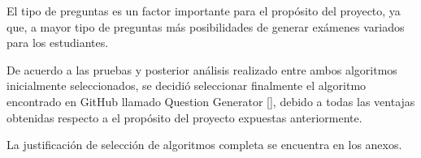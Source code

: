 \documentclass[../Main.tex]{subfiles}
\begin{document}
\begin{justify}
\begin{itemize}
    El tipo de preguntas es un factor importante para el propósito del proyecto, ya que, a mayor tipo de preguntas más posibilidades de generar exámenes variados para los estudiantes.
    
    De acuerdo a las pruebas y posterior análisis realizado entre ambos algoritmos inicialmente seleccionados, se decidió seleccionar finalmente el algoritmo encontrado en GitHub llamado Question Generator [], debido a todas las ventajas obtenidas respecto a el propósito del proyecto expuestas anteriormente.
\end{itemize}

    La justificación de selección de algoritmos completa se encuentra en los anexos.
\end{justify}
\end{document}
